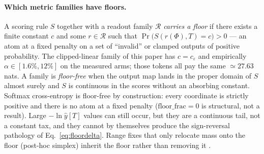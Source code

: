 \documentclass[preprint,12pt]{elsarticle}
\begin{document}
\paragraph{Which metric families have floors.}
A scoring rule $S$ together with a readout family $\mathcal{R}$
\emph{carries a floor} if there exists a finite constant $c$ and some
$r\in\mathcal{R}$ such that
$\Pr\bigl(S(r(\Phi),T)=c\bigr)>0$ --- an atom at a fixed penalty on a
set of ``invalid'' or clamped outputs of positive probability. The
clipped-linear family of this paper has $c=c_\varepsilon$ and
empirically $\alpha\in[1.6\%,12\%]$ on the measured arms; those
tokens all pay the same $\simeq 27.63$ nats. A family is
\emph{floor-free} when the output map lands in the proper domain of
$S$ almost surely and $S$ is continuous in the scores without an
absorbing constant. Softmax cross-entropy is floor-free by
construction: every coordinate is strictly positive and there is no
atom at a fixed penalty ($\mathrm{floor\_frac}=0$ is structural, not a
result). Large $-\ln\hat y[T]$ values can still occur, but they are a
continuous tail, not a constant tax, and they cannot by themselves
produce the sign-reversal pathology of Eq.~\eqref{eq:floordelta}.
Range fixes that only relocate mass onto the floor (post-hoc simplex)
inherit the floor rather than removing it \cite{redemf}.
\end{document}
